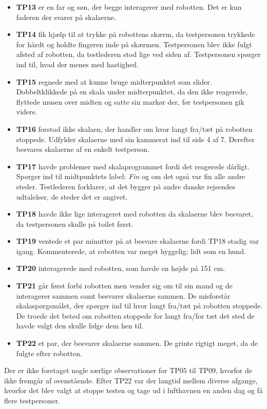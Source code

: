 \begin{itemize}
\item \textbf{TP13} er en far og søn, der begge interagerer med robotten. Det er kun faderen der svarer på skalaerne.
\item \textbf{TP14} fik hjælp til at trykke på robottens skærm, da testpersonen trykkede for hårdt og holdte fingeren inde på skærmen. Testpersonen blev ikke fulgt afsted af robotten, da testlederen stod lige ved siden af. Testpersonen spørger ind til, hvad der menes med hastighed.
\item \textbf{TP15} regnede med at kunne bruge midterpunktet som slider. Dobbeltklikkede på en skala under midterpunktet, da den ikke reagerede, flyttede musen over midten og satte sin markør der, før testpersonen gik videre.
\item \textbf{TP16} forstod ikke skalaen, der handler om hvor langt fra/tæt på robotten stoppede. Udfylder skalaerne med sin kammerat ind til side 4 af 7. Derefter besvares skalaerne af en enkelt testperson.
\item \textbf{TP17} havde problemer med skalaprogrammet fordi det reagerede dårligt. Spørger ind til midtpunktets label: \textit{Fin} og om det også var fin alle andre steder. Testlederen forklarer, at det bygger på andre danske rejsendes udtalelser, de steder det er angivet.
\item \textbf{TP18} havde ikke lige interageret med robotten da skalaerne blev besvaret, da testpersonen skulle på toilet først.
\item \textbf{TP19} ventede et par minutter på at besvare skalaerne fordi TP18 stadig var igang. Kommenterede, at robotten var meget hyggelig; lidt som en hund.
\item \textbf{TP20} interagerede med robotten, som havde en højde på 151 cm.
\item \textbf{TP21} går først forbi robotten men vender sig om til sin mand og de interagerer sammen samt besvarer skalaerne sammen. De misforstår skalaspørgsmålet, der spørger ind til hvor langt fra/tæt på robotten stoppede. De troede det betød om robotten stoppede for langt fra/for tæt det sted de havde valgt den skulle følge dem hen til.
\item \textbf{TP22} et par, der besvarer skalaerne sammen. De grinte rigtigt meget, da de fulgte efter robotten.\blankline
\end{itemize}
\noindent
%
Der er ikke foretaget nogle særlige observationer for TP05 til TP09, hvorfor de ikke fremgår af ovenstående. Efter TP22 var der langtid mellem diverse afgange, hvorfor det blev valgt at stoppe testen og tage ud i lufthavnen en anden dag og få flere testpersoner. 

